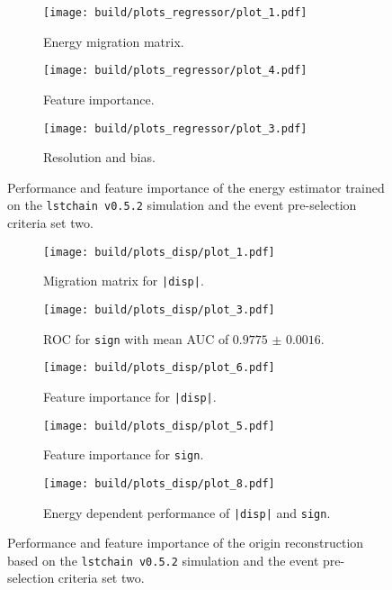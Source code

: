 \begin{figure}
    \centering
    \begin{subfigure}{0.49\textwidth}
        \centering
        \texttt{[image: build/plots\_regressor/plot\_1.pdf]}
        \caption{Energy migration matrix.}
    \end{subfigure}
    \hfill
    \begin{subfigure}{0.49\textwidth}
        \centering
        \texttt{[image: build/plots\_regressor/plot\_4.pdf]}
        \caption{Feature importance.}
    \end{subfigure}
    \newline\vfill
    \begin{subfigure}{0.7\textwidth}
        \centering
        \texttt{[image: build/plots\_regressor/plot\_3.pdf]}
        \caption{Resolution and bias.}
        \label{fig:regressor_newMC_150_bias}
    \end{subfigure}
    \caption{Performance and feature importance of the energy estimator trained on the \texttt{lstchain v0.5.2} simulation and the event pre-selection criteria set two.}
    \label{fig:regressor_newMC_150}
\end{figure}

\begin{figure}
    \centering
    \begin{subfigure}{0.49\textwidth}
        \centering
        \texttt{[image: build/plots\_disp/plot\_1.pdf]}
        \caption{Migration matrix for \texttt{|disp|}.}
    \end{subfigure}
    \hfill
    \begin{subfigure}{0.49\textwidth}
        \centering
        \texttt{[image: build/plots\_disp/plot\_3.pdf]}
        \caption{ROC for \texttt{sign} with mean AUC of $\num{0.9775(16)}$.}
    \end{subfigure}
    \newline\vfill
    \begin{subfigure}{0.49\textwidth}
        \centering
        \texttt{[image: build/plots\_disp/plot\_6.pdf]}
        \caption{Feature importance for \texttt{|disp|}.}
    \end{subfigure}
    \hfill
    \begin{subfigure}{0.49\textwidth}
        \centering
        \texttt{[image: build/plots\_disp/plot\_5.pdf]}
        \caption{Feature importance for \texttt{sign}.}
    \end{subfigure}
    \newline\vfill
    \begin{subfigure}{0.7\textwidth}
        \centering
        \texttt{[image: build/plots\_disp/plot\_8.pdf]}
        \caption{Energy dependent performance of \texttt{|disp|} and \texttt{sign}.}
        \label{fig:origin_newMC_150_e}
    \end{subfigure}
    \caption{Performance and feature importance of the origin reconstruction based on the \texttt{lstchain v0.5.2} simulation and the event pre-selection criteria set two.}
    \label{fig:origin_newMC_150}
\end{figure}

